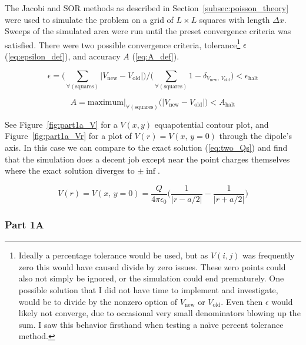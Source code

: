 \documentclass[notitlepage,aps,prd,nofootinbib]{revtex4-1}
\begin{document}
The Jacobi and SOR methods as described in Section~\ref{subsec:poisson_theory} were used to simulate the problem on a grid of $L \times L$ squares with length $\Delta x$. Sweeps of the simulated area were run until the preset convergence criteria was satisfied. There were two possible convergence criteria, tolerance\footnote{Ideally a percentage tolerance would be used, but as $V\left(i,j\right)$ was frequently zero this would have caused divide by zero issues. These zero points could also not simply be ignored, or the simulation could end prematurely. One possible solution that I did not have time to implement and investigate, would be to divide by the nonzero option of $V_{\mathrm{new}}$ or $V_{\mathrm{old}}$. Even then $\epsilon$ would likely not converge, due to occasional very small denominators blowing up the sum. I saw this behavior firsthand when testing a na\"{\i}ve percent tolerance method.} $\epsilon$ (\ref{eq:epsilon_def}), and accuracy $A$ (\ref{eq:A_def}).

\begin{equation} \label{eq:epsilon_def} 
\epsilon = \Bigg( \displaystyle\sum_{\forall (\mathrm{squares})} \left|V_{\mathrm{new}} - V_{\mathrm{old}}\right|\Bigg) / \Bigg( \displaystyle\sum_{\forall (\mathrm{squares})} 1 - \delta_{V_{\mathrm{new}},\,V_{\mathrm{old}}} \Bigg) < \epsilon_{\mathrm{halt}}
\end{equation}

\begin{equation} \label{eq:A_def} 
A = \mathrm{maximum}|_{\forall (\mathrm{squares})} \bigg(\left|V_{\mathrm{new}} - V_{\mathrm{old}}\right|\bigg) < A_{\mathrm{halt}}
\end{equation}

See Figure~\ref{fig:part1a_V} for a $V\left(x, y\right)$ equapotential contour plot, and Figure~\ref{fig:part1a_Vr} for a plot of $V\left(r\right) = V\left(x,\,y=0\right)$ through the dipole's axis. In this case we can compare to the exact solution (\ref{eq:two_Qs}) and find that the simulation does a decent job except near the point charges themselves where the exact solution diverges to $\pm \inf$.

\begin{equation} \label{eq:two_Qs} 
V\left(r\right) = V\left(x,\,y=0\right) = \frac{Q}{4 \pi \epsilon_{0}} \bigg( \frac{1}{\left|r-a/2\right|} - \frac{1}{\left|r+a/2\right|} \bigg)
\end{equation}

\clearpage
\subsubsection{Part 1A}
\label{subsubsec:part_1a}
\end{document}
